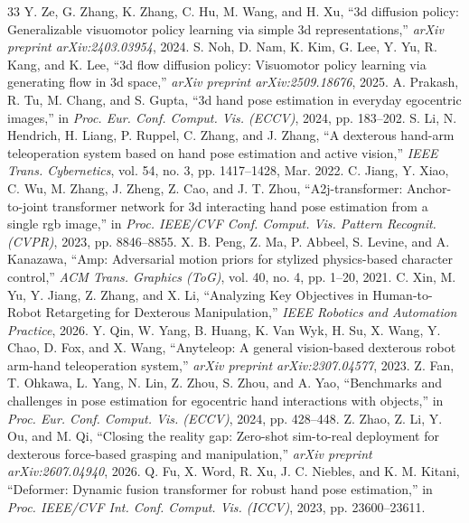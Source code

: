 \documentclass[letterpaper,journal]{IEEEtran}
\begin{document}
\begin{thebibliography}{33}
Y. Ze, G. Zhang, K. Zhang, C. Hu, M. Wang, and H. Xu, ``3d diffusion policy: Generalizable visuomotor policy learning via simple 3d representations,'' \textit{arXiv preprint arXiv:2403.03954}, 2024.
S. Noh, D. Nam, K. Kim, G. Lee, Y. Yu, R. Kang, and K. Lee, ``3d flow diffusion policy: Visuomotor policy learning via generating flow in 3d space,'' \textit{arXiv preprint arXiv:2509.18676}, 2025.
A. Prakash, R. Tu, M. Chang, and S. Gupta, ``3d hand pose estimation in everyday egocentric images,'' in \textit{Proc. Eur. Conf. Comput. Vis. (ECCV)}, 2024, pp. 183--202.
S. Li, N. Hendrich, H. Liang, P. Ruppel, C. Zhang, and J. Zhang, ``A dexterous hand-arm teleoperation system based on hand pose estimation and active vision,'' \textit{IEEE Trans. Cybernetics}, vol. 54, no. 3, pp. 1417--1428, Mar. 2022.
C. Jiang, Y. Xiao, C. Wu, M. Zhang, J. Zheng, Z. Cao, and J. T. Zhou, ``A2j-transformer: Anchor-to-joint transformer network for 3d interacting hand pose estimation from a single rgb image,'' in \textit{Proc. IEEE/CVF Conf. Comput. Vis. Pattern Recognit. (CVPR)}, 2023, pp. 8846--8855.
X. B. Peng, Z. Ma, P. Abbeel, S. Levine, and A. Kanazawa, ``Amp: Adversarial motion priors for stylized physics-based character control,'' \textit{ACM Trans. Graphics (ToG)}, vol. 40, no. 4, pp. 1--20, 2021.
C. Xin, M. Yu, Y. Jiang, Z. Zhang, and X. Li, ``Analyzing Key Objectives in Human-to-Robot Retargeting for Dexterous Manipulation,'' \textit{IEEE Robotics and Automation Practice}, 2026.
Y. Qin, W. Yang, B. Huang, K. Van Wyk, H. Su, X. Wang, Y. Chao, D. Fox, and X. Wang, ``Anyteleop: A general vision-based dexterous robot arm-hand teleoperation system,'' \textit{arXiv preprint arXiv:2307.04577}, 2023.
Z. Fan, T. Ohkawa, L. Yang, N. Lin, Z. Zhou, S. Zhou, and A. Yao, ``Benchmarks and challenges in pose estimation for egocentric hand interactions with objects,'' in \textit{Proc. Eur. Conf. Comput. Vis. (ECCV)}, 2024, pp. 428--448.
Z. Zhao, Z. Li, Y. Ou, and M. Qi, ``Closing the reality gap: Zero-shot sim-to-real deployment for dexterous force-based grasping and manipulation,'' \textit{arXiv preprint arXiv:2607.04940}, 2026.
Q. Fu, X. Word, R. Xu, J. C. Niebles, and K. M. Kitani, ``Deformer: Dynamic fusion transformer for robust hand pose estimation,'' in \textit{Proc. IEEE/CVF Int. Conf. Comput. Vis. (ICCV)}, 2023, pp. 23600--23611.

\end{thebibliography}
\end{document}
